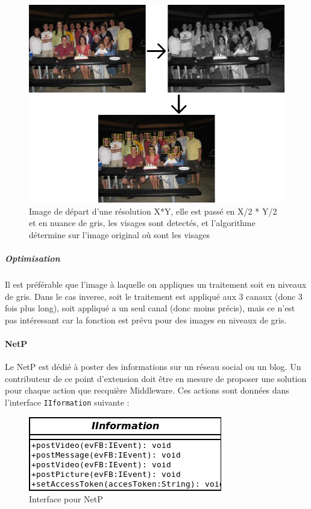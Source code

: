 				\begin{figure}[!h]
					\centering
					\includegraphics{img/reasoningVisages.png}
					\caption{Image de départ d'une résolution X*Y, elle est passé en X/2 * Y/2 et en nuance de gris, les visages sont detectés, et l'algorithme détermine sur l'image original où sont les visages}
					\label{divisionRGB}
				\end{figure}
			
			\subparagraph{Optimisation}
				Il est préférable que l'image à laquelle on appliques un traitement soit en niveaux de gris. Dans le cas inverse, soit le traitement est appliqué aux 3 canaux (donc 3 fois plus long), soit appliqué a un seul canal (donc moins précis), mais ce n'est pas intéressant car la fonction est prévu pour des images en niveaux de gris.
		\paragraph{NetP}
			Le  NetP est dédié à poster des informations sur un  réseau social ou un blog. Un contributeur de ce point d'extension doit être en mesure de proposer une solution pour chaque action que recquière Middleware. Ces actions sont données dans l'interface \verb+IIformation+ suivante :
			\begin{figure}[!htbp]
				\centering
				\includegraphics[scale=0.50]{img/iinterface}
				\caption{Interface pour NetP}
				\label{fig:IInterface}
			\end{figure}

